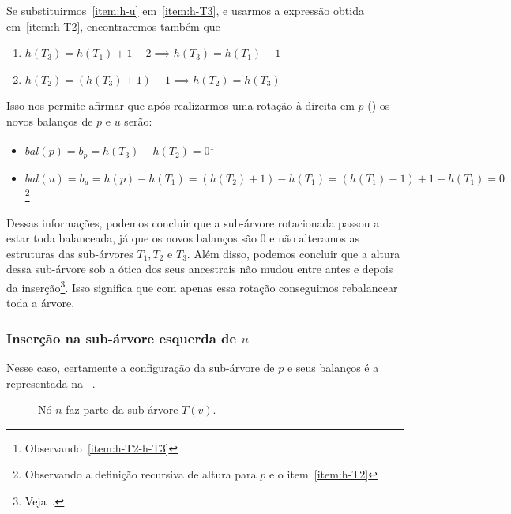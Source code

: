 \documentclass[11pt,twoside]{article}
\theoremstyle{definition}
\begin{document}
Se substituirmos~\ref{item:h-u} em~\ref{item:h-T3}, e usarmos a expressão obtida em~\ref{item:h-T2}, encontraremos também que
\begin{enumerate}[label={\Roman*.}, resume=alturas-simples]
	\item \( h(T_3) = h(T_1) + 1 - 2 \implies h(T_3) = h(T_1) - 1 \)
	\item \label{item:h-T2-h-T3} \( h(T_2) = (h(T_3) + 1) - 1 \implies h(T_2) = h(T_3) \)
\end{enumerate}

Isso nos permite afirmar que após realizarmos uma rotação à direita em \( p \) () os novos balanços de \( p \) e \( u \) serão:
\begin{itemize}
	\item \( bal(p) = b_p = h(T_3) - h(T_2) = 0 \)\footnote{Observando~\ref{item:h-T2-h-T3}}
	\item \( bal(u) = b_u = h(p) - h(T_1) = (h(T_2) + 1) - h(T_1) = (h(T_1) - 1) + 1 - h(T_1) = 0 \)\footnote{Observando a definição recursiva de altura para \( p \) e o item~\ref{item:h-T2}}
\end{itemize}

\begin{figure}[hbt]
	\caption{\label{fig:ins-rot-dir-post}}
	\centering
	
\end{figure}

Dessas informações, podemos concluir que a sub-árvore rotacionada passou a estar toda balanceada, já que os novos balanços são 0 e não alteramos as estruturas das sub-árvores \( T_1, T_2 \) e \( T_3 \). Além disso, podemos concluir que a altura dessa sub-árvore sob a ótica dos seus ancestrais não mudou entre antes e depois da inserção\footnote{Veja~.}. Isso significa que com apenas essa rotação conseguimos rebalancear toda a árvore.

\subsubsection{Inserção na sub-árvore esquerda de \( u \)}
\label{block:ins-rdd}

Nesse caso, certamente a configuração da sub-árvore de \( p \) e seus balanços é a representada na ~.
\begin{figure}[hbt]
	\caption{\label{fig:ins-rot-dupla-dir} Nó \( n \) faz parte da sub-árvore \( T(v) \).}
	\centering
	
\end{figure}
\end{document}
